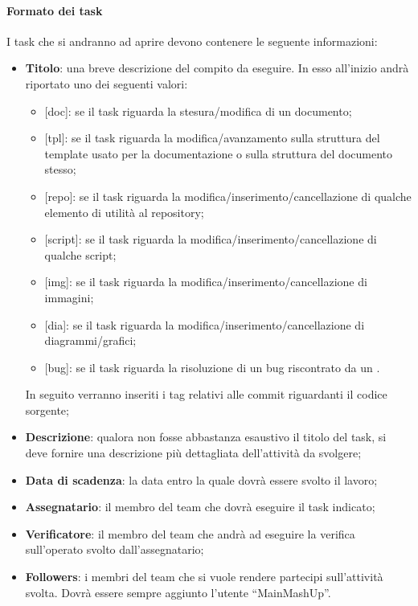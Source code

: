 			\paragraph{Formato dei task}
			\label{par:formato_dei_task}
			I task che si andranno ad aprire devono contenere le seguente informazioni:
				\begin{itemize}
					\item \textbf{Titolo}: una breve descrizione del compito da eseguire. In esso all'inizio andrà riportato uno dei seguenti valori:
						\begin{itemize}
							\item {[}doc{]}: se il task riguarda la stesura/modifica di un documento;
							\item {[}tpl{]}: se il task riguarda la modifica/avanzamento sulla struttura del template usato per la documentazione o sulla struttura del documento stesso;
							\item {[}repo{]}: se il task riguarda la modifica/inserimento/cancellazione di qualche elemento di utilità al repository;
							\item {[}script{]}: se il task riguarda la modifica/inserimento/cancellazione di qualche script;
							\item {[}img{]}: se il task riguarda la modifica/inserimento/cancellazione di immagini;
							\item {[}dia{]}: se il task riguarda la modifica/inserimento/cancellazione di diagrammi/grafici;
							\item {[}bug{]}: se il task riguarda la risoluzione di un bug riscontrato da un \roleVerifier.
						\end{itemize}
						\noindent
						In seguito verranno inseriti i tag relativi alle commit riguardanti il codice sorgente;

					\item \textbf{Descrizione}: qualora non fosse abbastanza esaustivo il titolo del task, si deve fornire una descrizione più dettagliata dell'attività da svolgere;
					\item \textbf{Data di scadenza}: la data entro la quale dovrà essere svolto il lavoro;
					\item \textbf{Assegnatario}: il membro del team che dovrà eseguire il task indicato;
					\item \textbf{Verificatore}: il membro del team che andrà ad eseguire la verifica sull'operato svolto dall'assegnatario;
					\item \textbf{Followers}: i membri del team che si vuole rendere partecipi sull'attività svolta. Dovrà essere sempre aggiunto l'utente ``MainMashUp''.
				\end{itemize}

